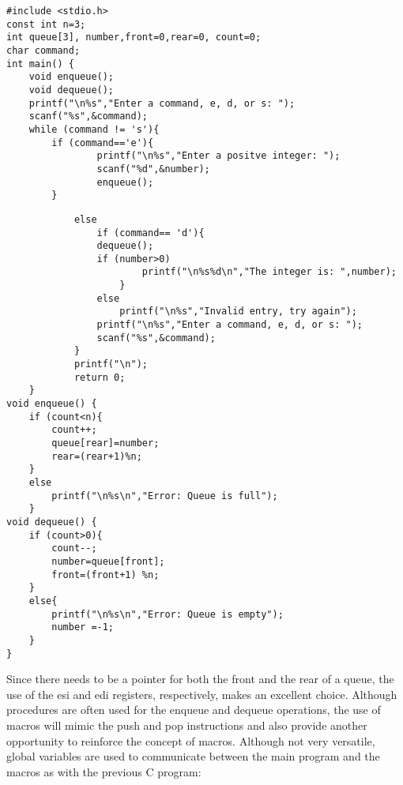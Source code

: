 \documentclass[10pt]{article}
\begin{document}
\begin{verbatim}
#include <stdio.h>
const int n=3;
int queue[3], number,front=0,rear=0, count=0;
char command;
int main() {
    void enqueue();
    void dequeue();
    printf("\n%s","Enter a command, e, d, or s: ");
    scanf("%s",&command);
    while (command != 's'){
        if (command=='e'){
                printf("\n%s","Enter a positve integer: ");
                scanf("%d",&number);
                enqueue();
        }
\end{verbatim}

\begin{verbatim}
            else
                if (command== 'd'){
                dequeue();
                if (number>0)
                        printf("\n%s%d\n","The integer is: ",number);
                    }
                else
                    printf("\n%s","Invalid entry, try again");
                printf("\n%s","Enter a command, e, d, or s: ");
                scanf("%s",&command);
            }
            printf("\n");
            return 0;
    }
void enqueue() {
    if (count<n){
        count++;
        queue[rear]=number;
        rear=(rear+1)%n;
    }
    else
        printf("\n%s\n","Error: Queue is full");
    }
void dequeue() {
    if (count>0){
        count--;
        number=queue[front];
        front=(front+1) %n;
    }
    else{
        printf("\n%s\n","Error: Queue is empty");
        number =-1;
    }
}
\end{verbatim}

Since there needs to be a pointer for both the front and the rear of a queue, the use of the esi and edi registers, respectively, makes an excellent choice. Although procedures are often used for the enqueue and dequeue operations, the use of macros will mimic the push and pop instructions and also provide another opportunity to reinforce the concept of macros. Although not very versatile, global variables are used to communicate between the main program and the macros as with the previous C program:
\end{document}
